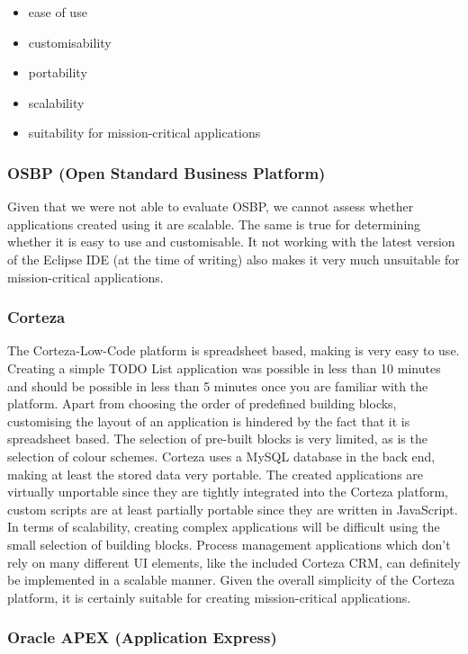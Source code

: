 \documentclass[runningheads]{llncs}
\begin{document}
\begin{itemize}
  \item ease of use
  \item customisability
  \item portability
  \item scalability
  \item suitability for mission-critical applications
\end{itemize}

\subsubsection{OSBP (Open Standard Business Platform)}

Given that we were not able to evaluate OSBP, we cannot assess whether applications created using it are scalable. The same is true for determining whether it is easy to use and customisable. It not working with the latest version of the Eclipse IDE (at the time of writing) also makes it very much unsuitable for mission-critical applications.

\subsubsection{Corteza}

The Corteza-Low-Code platform is spreadsheet based, making is very easy to use. Creating a simple TODO List application was possible in less than 10 minutes and should be possible in less than 5 minutes once you are familiar with the platform. Apart from choosing the order of predefined building blocks, customising the layout of an application is hindered by the fact that it is spreadsheet based. The selection of pre-built blocks is very limited, as is the selection of colour schemes. Corteza uses a MySQL database in the back end, making at least the stored data very portable. The created applications are virtually unportable since they are tightly integrated into the Corteza platform, custom scripts are at least partially portable since they are written in JavaScript. In terms of scalability, creating complex applications will be difficult using the small selection of building blocks. Process management applications which don't rely on many different UI elements, like the included Corteza CRM, can definitely be implemented in a scalable manner. Given the overall simplicity of the Corteza platform, it is certainly suitable for creating mission-critical applications.

\subsubsection{Oracle APEX (Application Express)}
\end{document}
